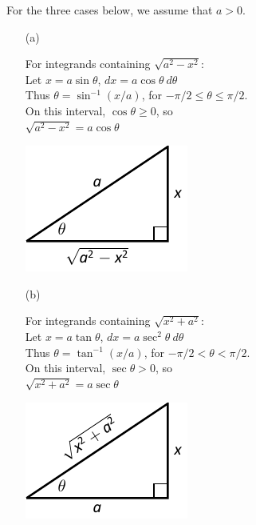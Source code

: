 \setboxwidth{100pt}
\hskip-100pt%
\noindent\begin{minipage}{\linewidth+100pt}
{For the three cases below, we assume that $a>0$.
\begin{enumerate}
	\item[(a)] \noindent%
		\begin{minipage}[t]{.6\linewidth}%
		For integrands containing $\sqrt{a^2-x^2}$:\\[5pt]
		Let $x=a\sin\theta$, \qquad $dx = a\cos\theta\ d\theta$\\[5pt]	
	Thus $\theta = \sin^{-1}(x/a)$, for $-\pi/2\leq \theta\leq \pi/2$. \\[5pt]	
	On this interval, $\cos\theta\geq 0$, so\\[5pt]	
	$\sqrt{a^2-x^2} = a\cos\theta$
		\end{minipage}\qquad
	\begin{minipage}[t]{.4\linewidth}\vskip 0pt
		\includegraphics{figures/figtrigsub_intro1}
		\end{minipage}
		
	\item[(b)] \noindent
	\begin{minipage}[t]{.6\linewidth}
		For integrands containing $\sqrt{x^2+a^2}$:\\[5pt]
		Let $x=a\tan\theta$, \qquad $dx = a\sec^2\theta\ d\theta$\\[5pt]	
	Thus $\theta = \tan^{-1}(x/a)$, for $-\pi/2 < \theta < \pi/2$. \\[5pt]	
	On this interval, $\sec\theta> 0$, so\\[5pt]	
	$\sqrt{x^2+a^2} = a\sec\theta$
		\end{minipage}\qquad
	\begin{minipage}[t]{.4\linewidth}\vskip 0pt
		\includegraphics{figures/figtrigsub_intro3}
		\end{minipage}
		

\end{enumerate}}
\end{minipage}
